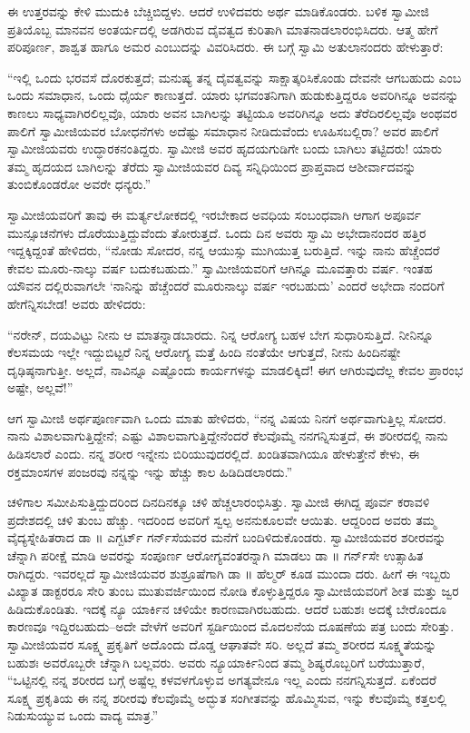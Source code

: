 ಈ ಉತ್ತರವನ್ನು ಕೇಳಿ ಮುದುಕಿ ಬೆಚ್ಚಿಬಿದ್ದಳು. ಆದರೆ ಉಳಿದವರು ಅರ್ಥ ಮಾಡಿಕೊಂಡರು. ಬಳಿಕ ಸ್ವಾಮೀಜಿ ಪ್ರತಿಯೊಬ್ಬ ಮಾನವನ ಅಂತರ್ಯದಲ್ಲಿ ಅಡಗಿರುವ ದೈವತ್ವದ ಕುರಿತಾಗಿ ಮಾತನಾಡಲಾರಂಭಿಸಿದರು. ಆತ್ಮ ಹೇಗೆ ಪರಿಪೂರ್ಣ, ಶಾಶ್ವತ ಹಾಗೂ ಅಮರ ಎಂಬುದನ್ನು ವಿವರಿಸಿದರು. ಈ ಬಗ್ಗೆ ಸ್ವಾಮಿ ಅತುಲಾನಂದರು ಹೇಳುತ್ತಾರೆ:

“ಇಲ್ಲಿ ಒಂದು ಭರವಸೆ ದೊರಕುತ್ತದೆ; ಮನುಷ್ಯ ತನ್ನ ದೈವತ್ವವನ್ನು ಸಾಕ್ಷಾತ್ಕರಿಸಿಕೊಂಡು ದೇವನೇ ಆಗಬಹುದು ಎಂಬ ಒಂದು ಸಮಾಧಾನ, ಒಂದು ಧೈರ್ಯ ಕಾಣುತ್ತದೆ. ಯಾರು ಭಗವಂತನಿಗಾಗಿ ಹುಡುಕುತ್ತಿದ್ದರೂ ಅವರಿಗಿನ್ನೂ ಅವನನ್ನು ಕಾಣಲು ಸಾಧ್ಯವಾಗಿರಲಿಲ್ಲವೊ, ಯಾರು ಅವನ ಬಾಗಿಲನ್ನು ತಟ್ಟಿಯೂ ಅವರಿಗಿನ್ನೂ ಅದು ತೆರೆದಿರಲಿಲ್ಲವೊ ಅಂಥವರ ಪಾಲಿಗೆ ಸ್ವಾಮೀಜಿಯವರ ಬೋಧನೆಗಳು ಅದೆಷ್ಟು ಸಮಾಧಾನ ನೀಡಿದುವೆಂದು ಊಹಿಸಬಲ್ಲಿರಾ? ಅವರ ಪಾಲಿಗೆ ಸ್ವಾಮೀಜಿಯವರು ಉದ್ಧಾರಕನಂತಿದ್ದರು. ಸ್ವಾಮೀಜಿ ಅವರ ಹೃದಯಗುಡಿಗೇ ಬಂದು ಬಾಗಿಲು ತಟ್ಟಿದರು! ಯಾರು ತಮ್ಮ ಹೃದಯದ ಬಾಗಿಲನ್ನು ತೆರೆದು ಸ್ವಾಮೀಜಿಯವರ ದಿವ್ಯ ಸನ್ನಿಧಿಯಿಂದ ಪ್ರಾಪ್ತವಾದ ಆಶೀರ್ವಾದವನ್ನು ತುಂಬಿಕೊಂಡರೋ ಅವರೇ ಧನ್ಯರು.”

ಸ್ವಾಮೀಜಿಯವರಿಗೆ ತಾವು ಈ ಮರ್ತ್ಯಲೋಕದಲ್ಲಿ ಇರಬೇಕಾದ ಅವಧಿಯ ಸಂಬಂಧವಾಗಿ ಆಗಾಗ ಅಪೂರ್ವ ಮುನ್ಸೂಚನೆಗಳು ದೊರೆಯುತ್ತಿದ್ದುವೆಂದು ತೋರುತ್ತದೆ. ಒಂದು ದಿನ ಅವರು ಸ್ವಾಮಿ ಅಭೇದಾನಂದರ ಹತ್ತಿರ ಇದ್ದಕ್ಕಿದ್ದಂತೆ ಹೇಳಿದರು, “ನೋಡು ಸೋದರ, ನನ್ನ ಆಯುಸ್ಸು ಮುಗಿಯುತ್ತ ಬರುತ್ತಿದೆ. ಇನ್ನು ನಾನು ಹೆಚ್ಚೆಂದರೆ ಕೇವಲ ಮೂರು-ನಾಲ್ಕು ವರ್ಷ ಬದುಕಬಹುದು.” ಸ್ವಾಮೀಜಿಯವರಿಗೆ ಆಗಿನ್ನೂ ಮೂವತ್ತಾರು ವರ್ಷ. ಇಂತಹ ಯೌವನ ದಲ್ಲಿರುವಾಗಲೇ ‘ನಾನಿನ್ನು ಹೆಚ್ಚೆಂದರೆ ಮೂರುನಾಲ್ಕು ವರ್ಷ ಇರಬಹುದು’ ಎಂದರೆ ಅಭೇದಾ ನಂದರಿಗೆ ಹೇಗೆನ್ನಿಸಬೇಡ! ಅವರು ಹೇಳಿದರು:

“ನರೇನ್, ದಯವಿಟ್ಟು ನೀನು ಆ ಮಾತನ್ನಾಡಬಾರದು. ನಿನ್ನ ಆರೋಗ್ಯ ಬಹಳ ಬೇಗ ಸುಧಾರಿಸುತ್ತಿದೆ. ನೀನಿನ್ನೂ ಕೆಲಸಮಯ ಇಲ್ಲೇ ಇದ್ದುಬಿಟ್ಟರೆ ನಿನ್ನ ಆರೋಗ್ಯ ಮತ್ತೆ ಹಿಂದಿ ನಂತೆಯೇ ಆಗುತ್ತದೆ, ನೀನು ಹಿಂದಿನಷ್ಟೇ ದೃಢಿಷ್ಠನಾಗುತ್ತೀ. ಅಲ್ಲದೆ, ನಾವಿನ್ನೂ ಎಷ್ಟೊಂದು ಕಾರ್ಯಗಳನ್ನು ಮಾಡಲಿಕ್ಕಿದೆ! ಈಗ ಆಗಿರುವುದೆಲ್ಲ ಕೇವಲ ಪ್ರಾರಂಭ ಅಷ್ಟೇ, ಅಲ್ಲವೆ!”

ಆಗ ಸ್ವಾಮೀಜಿ ಅರ್ಥಪೂರ್ಣವಾಗಿ ಒಂದು ಮಾತು ಹೇಳಿದರು, “ನನ್ನ ವಿಷಯ ನಿನಗೆ ಅರ್ಥವಾಗುತ್ತಿಲ್ಲ ಸೋದರ. ನಾನು ವಿಶಾಲವಾಗುತ್ತಿದ್ದೇನೆ; ಎಷ್ಟು ವಿಶಾಲವಾಗುತ್ತಿದ್ದೇನೆಂದರೆ ಕೆಲವೊಮ್ಮೆ ನನಗನ್ನಿಸುತ್ತದೆ, ಈ ಶರೀರದಲ್ಲಿ ನಾನು ಹಿಡಿಸಲಾರೆ ಎಂದು. ನನ್ನ ಶರೀರ ಇನ್ನೇನು ಬಿರಿಯುವುದರಲ್ಲಿದೆ. ಖಂಡಿತವಾಗಿಯೂ ಹೇಳುತ್ತೇನೆ ಕೇಳು, ಈ ರಕ್ತಮಾಂಸಗಳ ಪಂಜರವು ನನ್ನನ್ನು ಇನ್ನು ಹೆಚ್ಚು ಕಾಲ ಹಿಡಿದಿಡಲಾರದು.”

ಚಳಿಗಾಲ ಸಮೀಪಿಸುತ್ತಿದ್ದುದರಿಂದ ದಿನದಿನಕ್ಕೂ ಚಳಿ ಹೆಚ್ಚಲಾರಂಭಿಸಿತ್ತು. ಸ್ವಾಮೀಜಿ ಈಗಿದ್ದ ಪೂರ್ವ ಕರಾವಳಿ ಪ್ರದೇಶದಲ್ಲಿ ಚಳಿ ತುಂಬ ಹೆಚ್ಚು. ಇದರಿಂದ ಅವರಿಗೆ ಸ್ವಲ್ಪ ಅನನುಕೂಲವೇ ಆಯಿತು. ಆದ್ದರಿಂದ ಅವರು ತಮ್ಮ ವೈದ್ಯಸ್ನೇಹಿತರಾದ ಡಾ ॥ ಎಗ್ಬರ್ಟ್ ಗರ್ನ್​ಸೆಯವರ ಮನೆಗೆ ಬಂದಿಳಿದುಕೊಂಡರು. ಸ್ವಾಮೀಜಿಯವರ ಶರೀರವನ್ನು ಚೆನ್ನಾಗಿ ಪರೀಕ್ಷೆ ಮಾಡಿ ಅವರನ್ನು ಸಂಪೂರ್ಣ ಆರೋಗ್ಯವಂತರನ್ನಾಗಿ ಮಾಡಲು ಡಾ ॥ ಗರ್ನ್​ಸೇ ಉತ್ಸಾಹಿತ ರಾಗಿದ್ದರು. ಇವರಲ್ಲದೆ ಸ್ವಾಮೀಜಿಯವರ ಶುಶ್ರೂಷೆಗಾಗಿ ಡಾ ॥ ಹೆಲ್ಮರ್ ಕೂಡ ಮುಂದಾ ದರು. ಹೀಗೆ ಈ ಇಬ್ಬರು ವಿಖ್ಯಾತ ಡಾಕ್ಟರರೂ ಸೇರಿ ತುಂಬ ಮುತುವರ್ಜಿಯಿಂದ ನೋಡಿ ಕೊಳ್ಳುತ್ತಿದ್ದರೂ ಸ್ವಾಮೀಜಿಯವರಿಗೆ ಶೀತ ಮತ್ತು ಜ್ವರ ಹಿಡಿದುಕೊಂಡಿತು. ಇದಕ್ಕೆ ನ್ಯೂ ಯಾರ್ಕಿನ ಚಳಿಯೇ ಕಾರಣವಾಗಿರಬಹುದು. ಆದರೆ ಬಹುಶಃ ಅದಕ್ಕೆ ಬೇರೊಂದೂ ಕಾರಣವೂ ಇದ್ದಿರಬಹುದು–ಅದೇ ವೇಳೆಗೆ ಅವರಿಗೆ ಸ್ಟರ್ಡಿಯಿಂದ ಮೊದಲನೆಯ ದೂಷಣೆಯ ಪತ್ರ ಬಂದು ಸೇರಿತ್ತು. ಸ್ವಾಮೀಜಿಯವರ ಸೂಕ್ಷ್ಮ ಪ್ರಕೃತಿಗೆ ಅದೊಂದು ದೊಡ್ಡ ಆಘಾತವೇ ಸರಿ. ಅಲ್ಲದೆ ತಮ್ಮ ಶರೀರದ ಸೂಕ್ಷ್ಮತೆಯನ್ನು ಬಹುಶಃ ಅವರೊಬ್ಬರೇ ಚೆನ್ನಾಗಿ ಬಲ್ಲವರು. ಅವರು ನ್ಯೂಯಾರ್ಕಿನಿಂದ ತಮ್ಮ ಶಿಷ್ಯರೊಬ್ಬರಿಗೆ ಬರೆಯುತ್ತಾರೆ, “ಒಟ್ಟಿನಲ್ಲಿ ನನ್ನ ಶರೀರದ ಬಗ್ಗೆ ಅಷ್ಟೆಲ್ಲ ಕಳವಳಗೊಳ್ಳುವ ಅಗತ್ಯವೇನೂ ಇಲ್ಲ ಎಂದು ನನಗನ್ನಿಸುತ್ತದೆ. ಏಕೆಂದರೆ ಸೂಕ್ಷ್ಮ ಪ್ರಕೃತಿಯ ಈ ನನ್ನ ಶರೀರವು ಕೆಲವೊಮ್ಮೆ ಅದ್ಭುತ ಸಂಗೀತವನ್ನು ಹೊಮ್ಮಿಸುವ, ಇನ್ನು ಕೆಲವೊಮ್ಮೆ ಕತ್ತಲಲ್ಲಿ ನಿಡುಸುಯ್ಯುವ ಒಂದು ವಾದ್ಯ ಮಾತ್ರ.”

